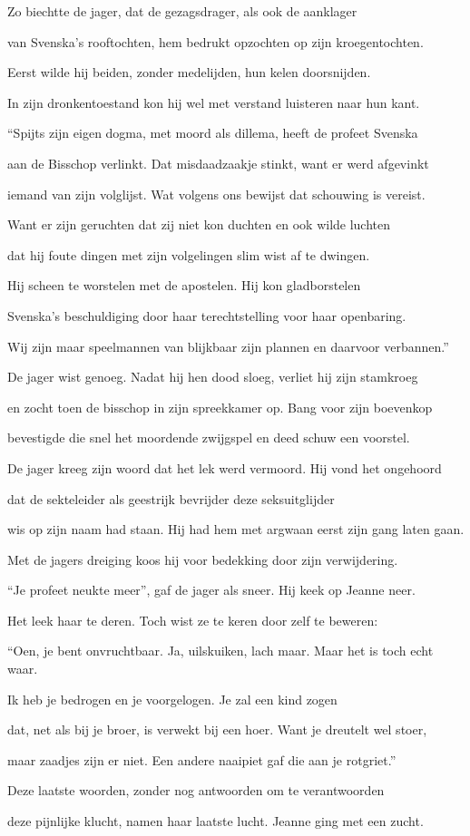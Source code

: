 Zo biechtte de jager,
dat de gezagsdrager,
als ook de aanklager

van Svenska’s rooftochten,
hem bedrukt opzochten
op zijn kroegentochten.

Eerst wilde hij beiden,
zonder medelijden,
hun kelen doorsnijden.

In zijn dronkentoestand
kon hij wel met verstand
luisteren naar hun kant.

“Spijts zijn eigen dogma,
met moord als dillema,
heeft de profeet Svenska

aan de Bisschop verlinkt.
Dat misdaadzaakje stinkt,
want er werd afgevinkt

iemand van zijn volglijst.
Wat volgens ons bewijst
dat schouwing is vereist.

Want er zijn geruchten
dat zij niet kon duchten
en ook wilde luchten

dat hij foute dingen
met zijn volgelingen
slim wist af te dwingen.

Hij scheen te worstelen
met de apostelen.
Hij kon gladborstelen

Svenska’s beschuldiging
door haar terechtstelling
voor haar openbaring.

Wij zijn maar speelmannen
van blijkbaar zijn plannen
en daarvoor verbannen.”

De jager wist genoeg.
Nadat hij hen dood sloeg,
verliet hij zijn stamkroeg

en zocht toen de bisschop
in zijn spreekkamer op.
Bang voor zijn boevenkop

bevestigde die snel
het moordende zwijgspel
en deed schuw een voorstel.

De jager kreeg zijn woord
dat het lek werd vermoord.
Hij vond het ongehoord

dat de sekteleider
als geestrijk bevrijder
deze seksuitglijder

wis op zijn naam had staan.
Hij had hem met argwaan
eerst zijn gang laten gaan.

Met de jagers dreiging
koos hij voor bedekking
door zijn verwijdering.

“Je profeet neukte meer”,
gaf de jager als sneer.
Hij keek op Jeanne neer.

Het leek haar te deren.
Toch wist ze te keren
door zelf te beweren:

“Oen, je bent onvruchtbaar.
Ja, uilskuiken, lach maar.
Maar het is toch echt waar.

Ik heb je bedrogen
en je voorgelogen.
Je zal een kind zogen

dat, net als bij je broer,
is verwekt bij een hoer.
Want je dreutelt wel stoer,

maar zaadjes zijn er niet.
Een andere naaipiet
gaf die aan je rotgriet.”

Deze laatste woorden,
zonder nog antwoorden
om te verantwoorden

deze pijnlijke klucht,
namen haar laatste lucht.
Jeanne ging met een zucht.
